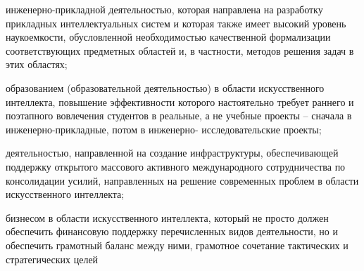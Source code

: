\begin{scnsubstruct}
{\begin{scnitemize}
            \item инженерно-прикладной деятельностью, которая направлена на разработку прикладных интеллектуальных систем и которая также имеет высокий уровень наукоемкости, обусловленной необходимостью качественной формализации соответствующих предметных областей и, в частности, методов решения задач в этих областях;
            \item образованием (образовательной деятельностью) в области искусственного интеллекта, повышение эффективности которого настоятельно требует раннего и поэтапного вовлечения студентов в реальные, а не учебные проекты -- сначала в инженерно-прикладные, потом в инженерно- исследовательские проекты;
            \item деятельностью, направленной на создание инфраструктуры, обеспечивающей поддержку открытого массового активного международного сотрудничества по консолидации усилий, направленных на решение современных проблем в области искусственного интеллекта;
            \item бизнесом в области искусственного интеллекта, который не просто должен обеспечить финансовую поддержку перечисленных видов деятельности, но и обеспечить грамотный баланс между ними, грамотное сочетание тактических и стратегических целей
        \end{scnitemize}
    }
    \begin{scnrelfromset}{
        }
    \end{scnrelfromset}

\end{scnsubstruct}
